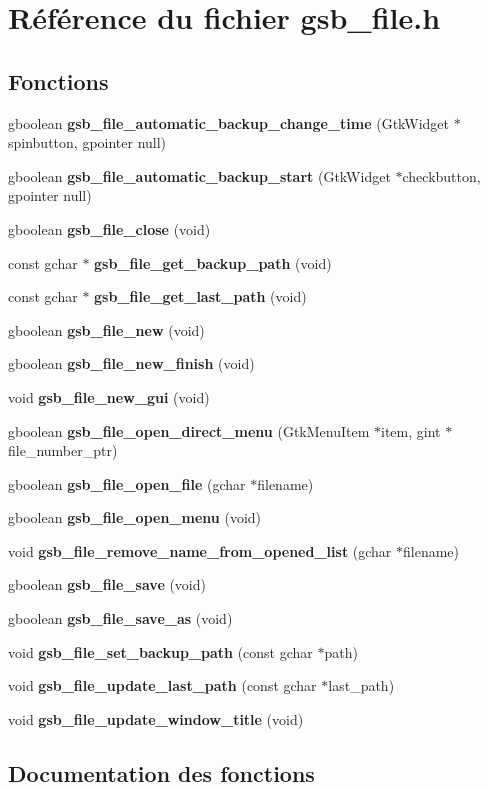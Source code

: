 \section{Référence du fichier gsb\_\-file.h}
\label{gsb__file_8h}
\subsection*{Fonctions}
\begin{DoxyCompactItemize}
\item 
gboolean {\bf gsb\_\-file\_\-automatic\_\-backup\_\-change\_\-time} (GtkWidget $\ast$spinbutton, gpointer null)
\item 
gboolean {\bf gsb\_\-file\_\-automatic\_\-backup\_\-start} (GtkWidget $\ast$checkbutton, gpointer null)
\item 
gboolean {\bf gsb\_\-file\_\-close} (void)
\item 
const gchar $\ast$ {\bf gsb\_\-file\_\-get\_\-backup\_\-path} (void)
\item 
const gchar $\ast$ {\bf gsb\_\-file\_\-get\_\-last\_\-path} (void)
\item 
gboolean {\bf gsb\_\-file\_\-new} (void)
\item 
gboolean {\bf gsb\_\-file\_\-new\_\-finish} (void)
\item 
void {\bf gsb\_\-file\_\-new\_\-gui} (void)
\item 
gboolean {\bf gsb\_\-file\_\-open\_\-direct\_\-menu} (GtkMenuItem $\ast$item, gint $\ast$file\_\-number\_\-ptr)
\item 
gboolean {\bf gsb\_\-file\_\-open\_\-file} (gchar $\ast$filename)
\item 
gboolean {\bf gsb\_\-file\_\-open\_\-menu} (void)
\item 
void {\bf gsb\_\-file\_\-remove\_\-name\_\-from\_\-opened\_\-list} (gchar $\ast$filename)
\item 
gboolean {\bf gsb\_\-file\_\-save} (void)
\item 
gboolean {\bf gsb\_\-file\_\-save\_\-as} (void)
\item 
void {\bf gsb\_\-file\_\-set\_\-backup\_\-path} (const gchar $\ast$path)
\item 
void {\bf gsb\_\-file\_\-update\_\-last\_\-path} (const gchar $\ast$last\_\-path)
\item 
void {\bf gsb\_\-file\_\-update\_\-window\_\-title} (void)
\end{DoxyCompactItemize}


\subsection{Documentation des fonctions}
